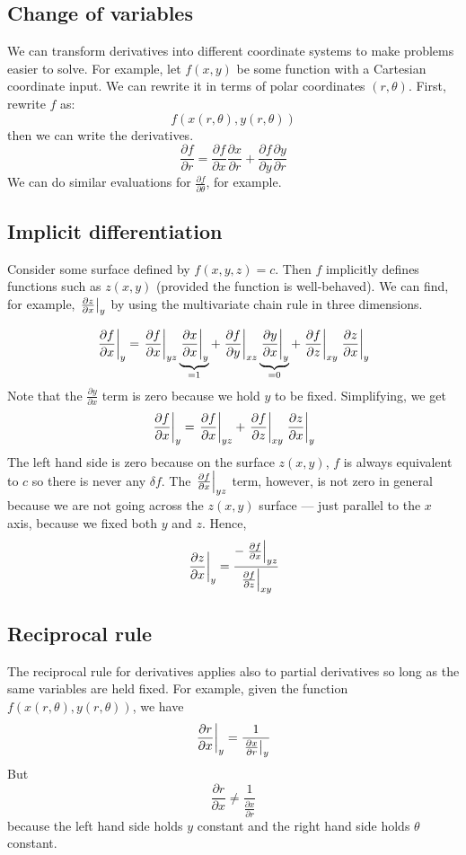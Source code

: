 \subsection{Change of variables}
We can transform derivatives into different coordinate systems to make problems easier to solve.
For example, let \(f(x, y)\) be some function with a Cartesian coordinate input.
We can rewrite it in terms of polar coordinates \((r, \theta)\).
First, rewrite \(f\) as:
\[
	f(x(r, \theta), y(r, \theta))
\]
then we can write the derivatives.
\[
	\frac{\partial f}{\partial r} = \frac{\partial f}{\partial x}\frac{\partial x}{\partial r} + \frac{\partial f}{\partial y}\frac{\partial y}{\partial r}
\]
We can do similar evaluations for \(\frac{\partial f}{\partial \theta}\), for example.

\subsection{Implicit differentiation}
Consider some surface defined by \(f(x, y, z) = c\).
Then \(f\) implicitly defines functions such as \(z(x, y)\) (provided the function is well-behaved).
We can find, for example, \(\eval{\frac{\partial z}{\partial x}}_y\) by using the multivariate chain rule in three dimensions.

\[
	\eval{\frac{\partial f}{\partial x}}_y =
	\eval{\frac{\partial f}{\partial x}}_{yz} \underbrace{\eval{\frac{\partial x}{\partial x}}_{y}}_{\mathclap{=1}} +
	\eval{\frac{\partial f}{\partial y}}_{xz} \underbrace{\eval{\frac{\partial y}{\partial x}}_{y}}_{\mathclap{=0}} +
	\eval{\frac{\partial f}{\partial z}}_{xy} \eval{\frac{\partial z}{\partial x}}_{y}
\]
Note that the \(\frac{\partial y}{\partial x}\) term is zero because we hold \(y\) to be fixed.
Simplifying, we get
\[
	\eval{\frac{\partial f}{\partial x}}_y =
	\eval{\frac{\partial f}{\partial x}}_{yz} +
	\eval{\frac{\partial f}{\partial z}}_{xy} \eval{\frac{\partial z}{\partial x}}_{y}
\]
The left hand side is zero because on the surface \(z(x, y)\), \(f\) is always equivalent to \(c\) so there is never any \(\delta f\).
The \(\eval{\frac{\partial f}{\partial x}}_{yz}\) term, however, is not zero in general because we are not going across the \(z(x, y)\) surface --- just parallel to the \(x\) axis, because we fixed both \(y\) and \(z\).
Hence,
\[
	\eval{\frac{\partial z}{\partial x}}_y = \frac{-\eval{\frac{\partial f}{\partial x}}_{yz}}{\eval{\frac{\partial f}{\partial z}}_{xy}}
\]

\subsection{Reciprocal rule}
The reciprocal rule for derivatives applies also to partial derivatives so long as the same variables are held fixed.
For example, given the function \(f(x(r, \theta), y(r, \theta))\), we have
\[
	\eval{\frac{\partial r}{\partial x}}_y = \frac{1}{\eval{\frac{\partial x}{\partial r}}_y}
\]
But
\[
	\frac{\partial r}{\partial x} \neq \frac{1}{\frac{\partial x}{\partial r}}
\]
because the left hand side holds \(y\) constant and the right hand side holds \(\theta\) constant.


